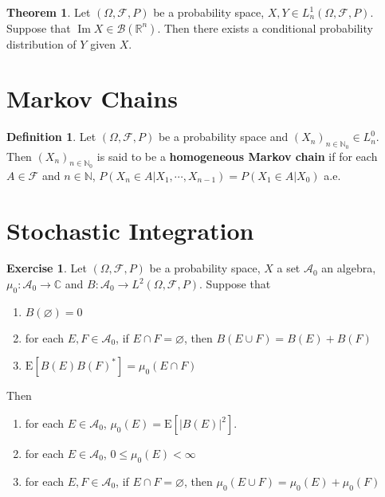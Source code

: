 \documentclass[12pt]{amsart}
\theoremstyle{definition}
\newtheorem{defn}[definition]{Definition}
\newtheorem{thm}[definition]{Theorem}
\newtheorem{ex}[definition]{Exercise}
\newcommand{\Om}{\Omega}
\newcommand{\C}{\mathbb{C}}
\newcommand{\N}{\mathbb{N}}
\newcommand{\R}{\mathbb{R}}
\newcommand{\MA}{\mathcal{A}}
\newcommand{\MB}{\mathcal{B}}
\newcommand{\MF}{\mathcal{F}}
\newcommand{\E}{\text{E}}
\DeclareMathOperator{\Img}{Im}
\begin{document}
	\begin{thm}
	Let $(\Om, \MF, P)$ be a probability space, $X,Y \in L_n^1(\Om, \MF, P)$. Suppose that $\Img X \in \MB(\R^n)$. Then there exists a conditional probability distribution of $Y$ given $X$. 
	\end{thm}
	
	
	
	
	
	
	
	
	
	
	
	
	
	
	\newpage
	\section{Markov Chains}	

	
	\begin{defn}
	Let $(\Om, \MF, P)$ be a probability space and $(X_n)_{n \in \N_0} \in L_n^0$. Then $(X_n)_{n \in \N_0}$ is said to be a \textbf{homogeneous Markov chain} if for each $A \in \MF$ and $n \in \N$, $P(X_n \in A| X_1, \cdots, X_{n-1}) = P(X_1 \in A| X_{0})$ a.e. 
	\end{defn}
	
	
	
	
	
	
	
	
	
	
	
	
	\newpage
	\section{Stochastic Integration}
	\begin{ex}
	Let $(\Om, \MF, P)$ be a probability space, $X$ a set $\MA_0$ an algebra, $\mu_0:\MA_0 \rightarrow \C$ and $B:\MA_0 \rightarrow L^2(\Om, \MF, P)$. 
	Suppose that 
	\begin{enumerate}
	\item $B(\varnothing) = 0$
	\item for each $E, F \in \MA_0$, if $E \cap F = \varnothing$, then $B(E \cup F) = B(E) + B(F)$
	\item $\E [B(E)B(F)^*] = \mu_0(E \cap F)$
	\end{enumerate}
	Then 
	\begin{enumerate}
	\item for each $E \in \MA_0$, $\mu_0(E) = \E[|B(E)|^2]$.
	\item for each $E \in \MA_0$, $0 \leq \mu_0(E) < \infty$ 
	\item for each $E, F \in \MA_0$, if $E \cap F = \varnothing$, then $\mu_0(E \cup F) = \mu_0(E) + \mu_0(F)$
	\end{enumerate}
	\end{ex}
	
\end{document}
